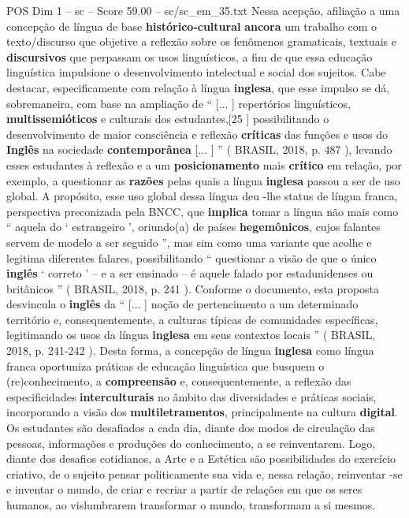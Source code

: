 \begin{textsample}{POS Dim 1 – sc – Score 59.00 – sc/sc\_em\_35.txt}
Nessa acepção, afiliação a uma concepção de língua de base \textbf{histórico-cultural} \textbf{ancora} um trabalho com o texto/discurso que objetive a reflexão sobre os fenômenos gramaticais, textuais e \textbf{discursivos} que perpassam os usos linguísticos, a fim de que essa educação linguística impulsione o desenvolvimento intelectual e social dos sujeitos.
Cabe destacar, especificamente com relação à língua \textbf{inglesa}, que esse impulso se dá, sobremaneira, com base na ampliação de “ [... ] repertórios linguísticos, \textbf{multissemióticos} e culturais dos estudantes,[25 ] possibilitando o desenvolvimento de maior consciência e reflexão \textbf{críticas} das funções e usos do \textbf{Inglês} na sociedade \textbf{contemporânea} [... ] ” ( BRASIL, 2018, p. 487 ), levando esses estudantes à reflexão e a um \textbf{posicionamento} mais \textbf{crítico} em relação, por exemplo, a questionar as \textbf{razões} pelas quais a língua \textbf{inglesa} passou a ser de uso global.
A propósito, esse uso global dessa língua deu -lhe status de língua franca, perspectiva preconizada pela BNCC, que \textbf{implica} tomar a língua não mais como “ aquela do ‘ estrangeiro ’, oriundo(a) de países \textbf{hegemônicos}, cujos falantes servem de modelo a ser seguido ”, mas sim como uma variante que acolhe e legitima diferentes falares, possibilitando “ questionar a visão de que o único \textbf{inglês} ‘ correto ’ – e a ser ensinado – é aquele falado por estadunidenses ou britânicos ” ( BRASIL, 2018, p. 241 ).
Conforme o documento, esta proposta desvincula o \textbf{inglês} da “ [... ] noção de pertencimento a um determinado território e, consequentemente, a culturas típicas de comunidades específicas, legitimando os usos da língua \textbf{inglesa} em seus contextos locais ” ( BRASIL, 2018, p. 241-242 ).
Desta forma, a concepção de língua \textbf{inglesa} como língua franca oportuniza práticas de educação linguística que busquem o (re)conhecimento, a \textbf{compreensão} e, consequentemente, a reflexão das especificidades \textbf{interculturais} no âmbito das diversidades e práticas sociais, incorporando a visão dos \textbf{multiletramentos}, principalmente na cultura \textbf{digital}.
Os estudantes são desafiados a cada dia, diante dos modos de circulação das pessoas, informações e produções do conhecimento, a se reinventarem.
Logo, diante dos desafios cotidianos, a Arte e a Estética são possibilidades do exercício criativo, de o sujeito pensar politicamente sua vida e, nessa relação, reinventar -se e inventar o mundo, de criar e recriar a partir de relações em que os seres humanos, ao vislumbrarem transformar o mundo, transformam a si mesmos.

\end{textsample}
